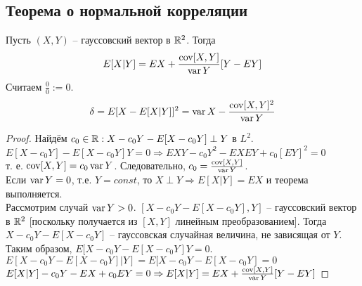         \subsection{Теорема о нормальной корреляции}
        \begin{theorem}\label{extralect:the3}
            Пусть $(X, Y)$ -- гауссовский вектор в $\mathbb{R}^2$. Тогда 
            \begin{eqnarray}
                E[X|Y] = EX + \frac{\operatorname*{cov}[X,Y]}{\operatorname*{var} Y} [Y- EY]
            \end{eqnarray}
            Считаем $\frac{0}{0}:=0$.
            \begin{eqnarray}
                \delta = E[X-E[X|Y]]^2=\operatorname*{var} X-\frac{\operatorname*{cov}[X,Y]^2}{\operatorname*{var} Y}
            \end{eqnarray}
        \end{theorem}

        \begin{proof}
            Найдём $c_0 \in \mathbb{R}: X-c_0 Y - E[X-c_0 Y] \perp Y$ в $L^2$.\\
            $E[X-c_0 Y]-E[X-c_0 Y]Y=0 \Rightarrow EXY - c_0 Y^2 - EX EY + c_0 [EY]^2 = 0$ \\
            т. е. $\operatorname*{cov}[X,Y]=c_0 \operatorname*{var} Y$. Следовательно, $c_0=\frac{\operatorname*{cov}[X,Y]}{\operatorname*{var} Y}$.\\
            Если $\operatorname*{var} Y = 0$, т.е. $Y=const$, то $X \perp Y \Rightarrow E[X|Y]=EX$ и теорема выполняется. \\
            Рассмотрим случай $\operatorname*{var} Y > 0$. $[X - c_0 Y - E[X - c_0 Y], Y]$ -- гауссовский вектор в $\mathbb{R}^2$ [поскольку получается из $[X,Y]$ линейным преобразованием].
            Тогда $X - c_0 Y - E[X - c_0 Y]$ -- гауссовская случайная величина, не зависящая от $Y$. Таким образом, ${E[X - c_0 Y - E[X - c_0 Y]Y = 0}$.
            \\$E[X-c_0 Y - E[X-c_0 Y]|Y]=E[X - c_0 Y - E[X - c_0 Y]=0$\\
            $E[X|Y]- c_0 Y - EX + c_0 EY = 0 \Rightarrow E[X|Y] = EX + \frac{\operatorname*{cov}[X,Y]}{\operatorname*{var} Y} [Y- EY]$
        \end{proof}
